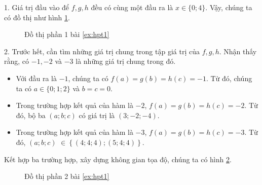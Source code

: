 \solution[ex:hpt1]

1. Giá trị đầu vào để $f, g, h$ đều có cùng một đầu ra là $x\in\{0;4\}$. Vậy, chúng ta có đồ thị như hình \ref{fig:hpt11}.

\begin{figure}[H]
   \centering
   \caption{Đồ thị phần 1 bài \ref{ex:hpt1}}
   \label{fig:hpt11}
\end{figure}

2. Trước hết, cần tìm những giá trị chung trong tập giá trị của $f, g, h$. Nhận thấy rằng, có $-1, -2$ và $-3$ là những giá trị chung trong đó. 
\begin{itemize}
   \item Với đầu ra là $-1$, chúng ta có $f(a) = g(b) = h(c) = -1$. Từ đó, chúng ta có $a \in \{0; 1; 2\}$ và $b = c = 0$.
   \item Trong trường hợp kết quả của hàm là $-2$, $f(a) = g(b) = h(c) = -2$. Từ đó, bộ ba $\left(a; b; c\right)$ có giá trị là $(3; -2; -4)$.
   \item Trong trường hợp kết quả của hàm là $-3$, $f(a) = g(b) = h(c) = -3$. Từ đó, $\left(a; b; c\right)$ $\in \left\{\left(4; 4; 4\right); \left(5; 4; 4\right)\right\}$.
\end{itemize}
Kết hợp ba trường hợp, xây dựng không gian tọa độ, chúng ta có hình \ref{fig:hpt12}.

\begin{figure}[H]
   \centering
   \caption{Đồ thị phần 2 bài \ref{ex:hpt1}}
   \label{fig:hpt12}
\end{figure}

